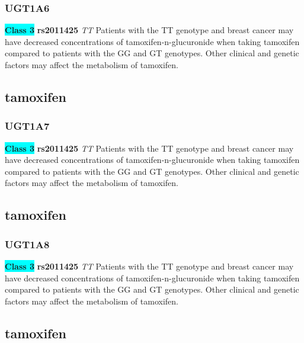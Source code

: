 \documentclass{book}
\begin{document}
\subsubsection{ UGT1A6 }

\begin{center}
\textbf{\colorbox{cyan} {Class 3}} \textbf{ rs2011425 } \textit{ TT }
Patients with the TT genotype and breast cancer may have decreased concentrations of tamoxifen-n-glucuronide when taking tamoxifen compared to patients with the GG and GT genotypes. Other clinical and genetic factors may affect the metabolism of tamoxifen.


\end{center}\subsection{ tamoxifen }


\subsubsection{ UGT1A7 }

\begin{center}
\textbf{\colorbox{cyan} {Class 3}} \textbf{ rs2011425 } \textit{ TT }
Patients with the TT genotype and breast cancer may have decreased concentrations of tamoxifen-n-glucuronide when taking tamoxifen compared to patients with the GG and GT genotypes. Other clinical and genetic factors may affect the metabolism of tamoxifen.


\end{center}\subsection{ tamoxifen }


\subsubsection{ UGT1A8 }

\begin{center}
\textbf{\colorbox{cyan} {Class 3}} \textbf{ rs2011425 } \textit{ TT }
Patients with the TT genotype and breast cancer may have decreased concentrations of tamoxifen-n-glucuronide when taking tamoxifen compared to patients with the GG and GT genotypes. Other clinical and genetic factors may affect the metabolism of tamoxifen.


\end{center}\subsection{ tamoxifen }
\end{document}
